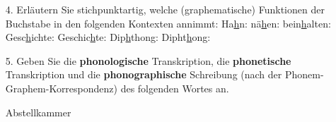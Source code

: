 {%
\begin{frame}
	\begin{itemize}
		\item[4.] Erläutern Sie stichpunktartig, welche (graphematische) Funktionen der Buchstabe  in den folgenden Kontexten annimmt:
	\eal
			\ex Ha\underline{h}n:
			\ex nä\underline{h}en:
			\ex bein\underline{h}alten:
			\ex Gesc\underline{h}ichte:
			\ex Geschic\underline{h}te:
			\ex Dip\underline{h}thong:
			\ex Dipht\underline{h}ong:
	\zl
	\end{itemize}
\end{frame}


\begin{frame}
	\begin{itemize}
		\item[5.] Geben Sie die \textbf{phonologische} Transkription, die \textbf{phonetische} Transkription und die \textbf{phonographische} Schreibung (nach der Phonem-Graphem-Korrespondenz) des folgenden Wortes an.
		
		\ea Abstellkammer
		\z
		
	\end{itemize}
\end{frame}

} 
